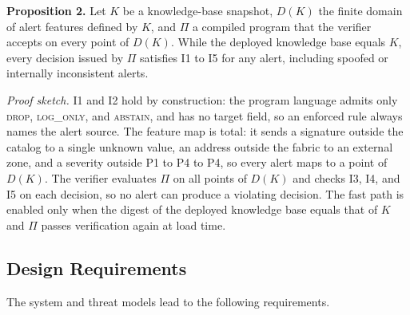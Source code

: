\documentclass[final,5p]{elsarticle}
\begin{document}
\textbf{Proposition 2.}
Let $K$ be a knowledge-base snapshot, $D(K)$ the finite domain of alert features defined by $K$, and $\Pi$ a compiled program that the verifier accepts on every point of $D(K)$. While the deployed knowledge base equals $K$, every decision issued by $\Pi$ satisfies I1 to I5 for any alert, including spoofed or internally inconsistent alerts.

\textit{Proof sketch.}
I1 and I2 hold by construction: the program language admits only \textsc{drop}, \textsc{log\_only}, and \textsc{abstain}, and has no target field, so an enforced rule always names the alert source. The feature map is total: it sends a signature outside the catalog to a single unknown value, an address outside the fabric to an external zone, and a severity outside P1 to P4 to P4, so every alert maps to a point of $D(K)$. The verifier evaluates $\Pi$ on all points of $D(K)$ and checks I3, I4, and I5 on each decision, so no alert can produce a violating decision. The fast path is enabled only when the digest of the deployed knowledge base equals that of $K$ and $\Pi$ passes verification again at load time.

\subsection{Design Requirements}
\label{sec:requirements}

The system and threat models lead to the following requirements.
\end{document}
